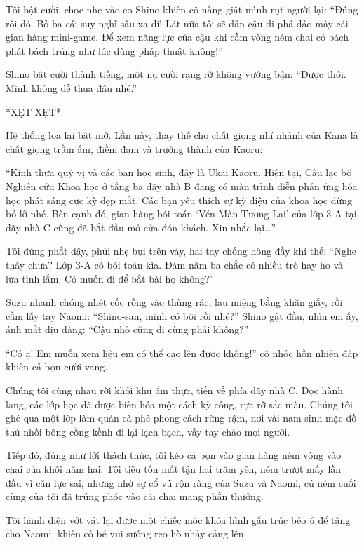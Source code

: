 \documentclass[../main.tex]{subfiles}
\begin{document}
Tôi bật cười, chọc nhẹ vào eo Shino khiến cô nàng giật mình rụt người lại: ``Đúng rồi đó. Bỏ ba cái suy nghĩ sâu xa đi! Lát nữa tôi sẽ dẫn cậu đi phá đảo mấy cái gian hàng mini-game. Để xem năng lực của cậu khi cầm vòng ném chai có bách phát bách trúng như lúc dùng pháp thuật không!''

Shino bật cười thành tiếng, một nụ cười rạng rỡ không vướng bận: ``Được thôi. Mình không dễ thua đâu nhé.''

*XẸT XẸT*

Hệ thống loa lại bật mở. Lần này, thay thế cho chất giọng nhí nhảnh của Kana là chất giọng trầm ấm, điềm đạm và trưởng thành của Kaoru:

``Kính thưa quý vị và các bạn học sinh, đây là Ukai Kaoru. Hiện tại, Câu lạc bộ Nghiên cứu Khoa học ở tầng ba dãy nhà B đang có màn trình diễn phản ứng hóa học phát sáng cực kỳ đẹp mắt. Các bạn yêu thích sự kỳ diệu của khoa học đừng bỏ lỡ nhé. Bên cạnh đó, gian hàng bói toán `Vén Màn Tương Lai' của lớp 3-A tại dãy nhà C cũng đã bắt đầu mở cửa đón khách. Xin nhắc lại\dots''

Tôi đứng phắt dậy, phủi nhẹ bụi trên váy, hai tay chống hông đầy khí thế: ``Nghe thấy chưa? Lớp 3-A có bói toán kìa. Đám năm ba chắc có nhiều trò hay ho và lừa tình lắm. Có muốn đi để bắt bài họ không?''

Suzu nhanh chóng nhét cốc rỗng vào thùng rác, lau miệng bằng khăn giấy, rồi cầm lấy tay Naomi: ``Shino-san, mình có bội rồi nhé?'' Shino gật đầu, nhìn em ấy, ánh mắt dịu dàng: ``Cậu nhỏ cũng đi cùng phải không?''

``Có ạ! Em muốn xem liệu em có thể cao lên được không!'' cô nhóc hồn nhiên đáp khiến cả bọn cười vang.

Chúng tôi cùng nhau rời khỏi khu ẩm thực, tiến về phía dãy nhà C. Dọc hành lang, các lớp học đã được biến hóa một cách kỳ công, rực rỡ sắc màu. Chúng tôi ghé qua một lớp làm quán cà phê phong cách rừng rậm, nơi vài nam sinh mặc đồ thú nhồi bông cồng kềnh đi lại lạch bạch, vẫy tay chào mọi người.

Tiếp đó, đúng như lời thách thức, tôi kéo cả bọn vào gian hàng ném vòng vào chai của khối năm hai. Tôi tiêu tốn mất tận hai trăm yên, ném trượt mấy lần đầu vì căn lực sai, nhưng nhờ sự cổ vũ rộn ràng của Suzu và Naomi, cú ném cuối cùng của tôi đã trúng phóc vào cái chai mang phần thưởng.

Tôi hãnh diện vớt vát lại được một chiếc móc khóa hình gấu trúc béo ú để tặng cho Naomi, khiến cô bé vui sướng reo hò nhảy cẫng lên.
\end{document}
